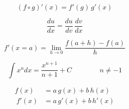 






\[\begin{equation} (f \circ g)' (x) = f'(g) \, g'(x) \end{equation}\]

\[\begin{equation} \frac {du}{dx} = \frac {du}{dv} \, \frac {dv}{dx} \end{equation}\]

\[\begin{equation} f'(x\!=\!a)=\lim_{h \to 0}\frac{f(a + h) - f(a)}{h} \end{equation}\]

\[\begin{equation} \int x^n dx = \frac{x^{n+1}}{n+1} + C \qquad\qquad n \neq -1 \end{equation}\]

\[\begin{align} f(x) &= a \, g(x) + b \, h(x) \\\ f'(x) &= a \, g'(x) + b \, h'(x) \end{align}\]

